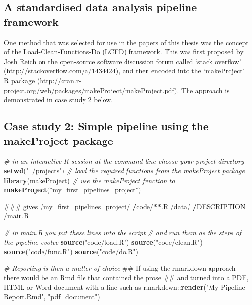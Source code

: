 \documentclass[11pt,a4paper]{article}
\newenvironment{Shaded}{\begin{snugshade}}{\end{snugshade}}
\newcommand{\KeywordTok}[1]{\textcolor[rgb]{0.13,0.29,0.53}{\textbf{{#1}}}}
\newcommand{\StringTok}[1]{\textcolor[rgb]{0.31,0.60,0.02}{{#1}}}
\newcommand{\CommentTok}[1]{\textcolor[rgb]{0.56,0.35,0.01}{\textit{{#1}}}}
\newcommand{\ErrorTok}[1]{\textbf{{#1}}}
\newcommand{\NormalTok}[1]{{#1}}
\begin{document}
\subsection{A standardised data analysis pipeline
framework}\label{a-standardised-data-analysis-pipeline-framework}

One method that was selected for use in the papers of this thesis was
the concept of the Load-Clean-Functions-Do (LCFD) framework. This was
first proposed by Josh Reich on the open-source software discussion
forum called `stack overflow'
(\url{http://stackoverflow.com/a/1434424}), and then encoded into the
`makeProject' R package
(\url{http://cran.r-project.org/web/packages/makeProject/makeProject.pdf}).
The approach is demonstrated in case study 2 below.

\clearpage

\subsection{Case study 2: Simple pipeline using the makeProject
package}\label{case-study-2-simple-pipeline-using-the-makeproject-package}

\begin{Shaded}
\begin{Highlighting}[]
\CommentTok{# in an interactive R session at the command line choose your project directory}
\KeywordTok{setwd}\NormalTok{(}\StringTok{"~/projects"}\NormalTok{)   }
\CommentTok{# load the required functions from the makeProject package}
\KeywordTok{library}\NormalTok{(makeProject)}
\CommentTok{# use the makeProject function to }
\KeywordTok{makeProject}\NormalTok{(}\StringTok{"my_first_pipelines_project"}\NormalTok{)}

\NormalTok{### gives}
\NormalTok{/my_first_pipelines_project/}
\StringTok{    }\ErrorTok{/}\NormalTok{code/}\ErrorTok{**}\NormalTok{.R}
    \NormalTok{/data/}
\StringTok{    }\ErrorTok{/}\NormalTok{DESCRIPTION}
    \NormalTok{/main.R}

\CommentTok{# in main.R you put these lines into the script}
\CommentTok{# and run them as the steps of the pipeline evolve}
\KeywordTok{source}\NormalTok{(}\StringTok{"code/load.R"}\NormalTok{)}
\KeywordTok{source}\NormalTok{(}\StringTok{"code/clean.R"}\NormalTok{)}
\KeywordTok{source}\NormalTok{(}\StringTok{"code/func.R"}\NormalTok{)}
\KeywordTok{source}\NormalTok{(}\StringTok{"code/do.R"}\NormalTok{)}

\CommentTok{# Reporting is then a matter of choice}
\NormalTok{## If using the rmarkdown approach there would be an Rmd file that contained the prose}
\NormalTok{## and turned into a PDF, HTML or Word document with a line such as }
\NormalTok{rmarkdown::}\KeywordTok{render}\NormalTok{(}\StringTok{"My-Pipeline-Report.Rmd"}\NormalTok{, }\StringTok{"pdf_document"}\NormalTok{)}
\end{Highlighting}
\end{Shaded}
\end{document}

